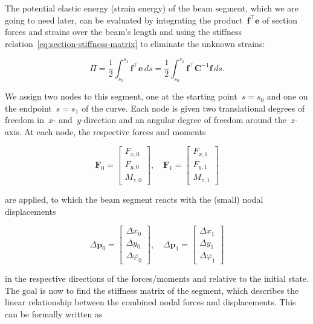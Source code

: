 The potential elastic energy (strain energy) of the beam segment, which we are going to need later, can be evaluated by integrating the product~$\boldsymbol{f}^\intercal\boldsymbol{e}$ of section forces and strains over the beam's length and using the stiffness relation~\eqref{eq:section-stiffness-matrix} to eliminate the unknown strains:

\begin{equation}
\Pi = \frac{1}{2}\int_{s_0}^{s_1} \boldsymbol{f}^\intercal\boldsymbol{e}\,ds = \frac{1}{2}\int_{s_0}^{s_1} \boldsymbol{f}^\intercal\boldsymbol{C}^{-1}\boldsymbol{f}\,ds. \label{eq:section-potential-energy}
\end{equation}

We assign two nodes to this segment, one at the starting point~$s = s_0$ and one on the endpoint~$s = s_1$ of the curve.
Each node is given two translational degrees of freedom in~$x$- and~$y$-direction and an angular degree of freedom around the~$z$-axis.
At each node, the respective forces and moments

\begin{equation}
\boldsymbol{F}_{0} = \begin{bmatrix}
F_{x,0} \\ F_{y,0} \\ M_{z,0}
\end{bmatrix},
\quad
\boldsymbol{F}_{1} = \begin{bmatrix}
F_{x,1} \\ F_{y,1} \\ M_{z,1}
\end{bmatrix}
\end{equation}

are applied, to which the beam segment reacts with the (small) nodal displacements

\begin{equation}
\Delta\boldsymbol{p}_{0} = \begin{bmatrix}
\Delta x_0 \\ \Delta y_0 \\ \Delta \varphi_0
\end{bmatrix},
\quad
\Delta\boldsymbol{p}_{1} = \begin{bmatrix}
\Delta x_1 \\ \Delta y_1 \\ \Delta \varphi_1
\end{bmatrix}
\end{equation}

in the respective directions of the forces/moments and relative to the initial state.
The goal is now to find the stiffness matrix of the segment, which describes the linear relationship between the combined nodal forces and displacements.
This can be formally written as


